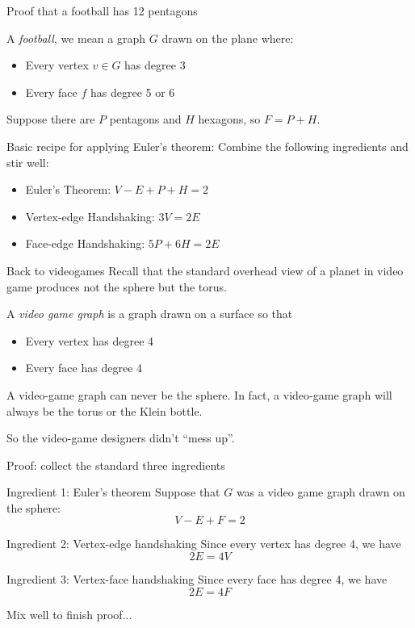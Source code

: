 \documentclass{beamer}
\begin{document}
\begin{frame}{Proof that a football has 12 pentagons}
\begin{definition}
  A \emph{football}, we mean a graph $G$ drawn on the plane where:
  \begin{itemize}
  \item Every vertex $v\in G$ has degree 3
  \item Every face $f$ has degree 5 or 6
  \end{itemize}
\end{definition}

  Suppose there are $P$ pentagons and $H$ hexagons, so $F=P+H$.

\begin{block}{Basic recipe for applying Euler's theorem:}
Combine the following ingredients and stir well:
  \begin{itemize}
\item  Euler's Theorem: $V-E+P+H=2$
\item Vertex-edge Handshaking: $3V=2E$
\item Face-edge Handshaking: $5P+6H=2E$
  \end{itemize}
\end{block}


  

\end{frame}

\begin{frame}{Back to videogames}
  Recall that the standard overhead view of a planet in video game produces not the sphere but the torus.
  \begin{definition} A \emph{video game graph} is a graph drawn on a surface so that
    \begin{itemize}
    \item Every vertex has degree 4
    \item Every face has degree 4
    \end{itemize}
  \end{definition}

  \begin{theorem} A video-game graph can never be the sphere.  In fact, a video-game graph will always be the torus or the Klein bottle.
       \end{theorem}
So the video-game designers didn't ``mess up''.
\end{frame}
\begin{frame}{Proof: collect the standard three ingredients}
  \begin{block}{Ingredient 1: Euler's theorem}
    Suppose that $G$ was a video game graph drawn on the sphere: $$V-E+F=2$$
  \end{block}
  \begin{block}{Ingredient 2: Vertex-edge handshaking}
    Since every vertex has degree 4, we have
    $$2E=4V$$
  \end{block}

  \begin{block}{Ingredient 3: Vertex-face handshaking}
    Since every face has degree 4, we have
    $$2E=4F$$
    \end{block}
Mix well to finish proof...
  
  \end{frame}
\end{document}
